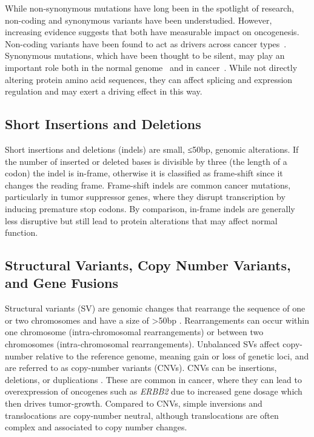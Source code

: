 \documentclass[11pt]{book}
\begin{document}
While non-synonymous mutations have long been in the spotlight of research, non-coding and synonymous variants have been understudied. However, increasing evidence suggests that both have measurable impact on oncogenesis. Non-coding variants have been found to act as drivers across cancer types~\cite{Rheinbay:2020}. Synonymous mutations, which have been thought to be silent, may play an important role both in the normal genome~\cite{Lebeuf-Taylor:2019} and in cancer~\cite{Supek:2014, Sharma:2020}. While not directly altering protein amino acid sequences, they can affect splicing and expression regulation and may exert a driving effect in this way.


\subsection{Short Insertions and Deletions}

Short insertions and deletions (indels) are small, ≤50bp, genomic alterations. If the number of inserted or deleted bases is divisible by three (the length of a codon) the indel is in-frame, otherwise it is classified as frame-shift since it changes the reading frame. Frame-shift indels are common cancer mutations, particularly in tumor suppressor genes, where they disrupt transcription by inducing premature stop codons. By comparison, in-frame indels are generally less disruptive but still lead to protein alterations that may affect normal function.


\subsection{Structural Variants, Copy Number Variants, and Gene Fusions}

Structural variants (SV) are genomic changes that rearrange the sequence of one or two chromosomes and have a size of >50bp \cite{Alkan:2011}. Rearrangements can occur within one chromosome (intra-chromosomal rearrangements) or between two chromosomes (intra-chromo\-somal rearrangements). Unbalanced SVs affect copy-number relative to the reference genome, meaning gain or loss of genetic loci, and are referred to as copy-number variants (CNVs). CNVs can be insertions, deletions, or duplications \cite{Feuk:2006}. These are common in cancer, where they can lead to overexpression of oncogenes such as \textit{ERBB2} due to increased gene dosage which then drives tumor-growth. Compared to CNVs, simple inversions and translocations are copy-number neutral, although translocations are often complex and associated to copy number changes.
\end{document}
